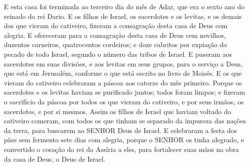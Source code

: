 {E esta casa foi terminada ao terceiro dia do mês de Adar, que era o sexto ano do reinado do rei Dario.
E os filhos de Israel, os sacerdotes e os levitas, e os demais dos que vieram do cativeiro,
 fizeram a consagração desta casa de Deus com alegria.
E ofereceram para a consagração desta casa de Deus cem novilhos, duzentos carneiros, quatrocentos cordeiros; e doze cabritos por expiação do pecado de todo Israel, segundo o número das tribos de Israel.
E puseram aos sacerdotes em suas divisões, e aos levitas em seus grupos, para o serviço a Deus, que está em Jerusalém, conforme o que está escrito no livro de Moisés.
E os que vieram do cativeiro celebraram a páscoa aos catorze do mês primeiro.
Porque os sacerdotes e os levitas haviam se purificado juntos; todos foram limpos; e fizeram o sacrifício da páscoa por todos os que vieram do cativeiro, e por seus irmãos, os sacerdotes, e por si mesmos.
Assim os filhos de Israel que haviam voltado do cativeiro comeram, com todos os que tinham se separado da impureza das nações da terra, para buscarem ao SENHOR Deus de Israel.
E celebraram a festa dos pães sem fermento sete dias com alegria, porque o SENHOR os tinha alegrado, e convertido o coração do rei da Assíria a eles, para fortalecer suas mãos na obra da casa de Deus, o Deus de Israel.

}
